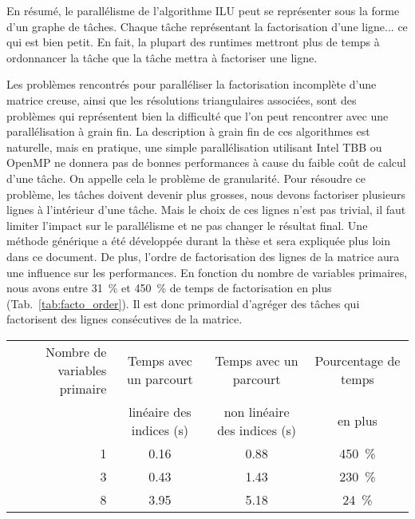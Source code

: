 En résumé, le parallélisme de l'algorithme ILU peut se représenter sous la forme d'un graphe de tâches.
%
Chaque tâche représentant la factorisation d'une ligne... ce qui est bien petit.
%
En fait, la plupart des runtimes mettront plus de temps à ordonnancer la tâche que la tâche mettra à factoriser une ligne.


Les problèmes rencontrés pour paralléliser la factorisation incomplète d'une matrice creuse, ainsi que les résolutions triangulaires associées, sont des problèmes qui représentent bien la difficulté que l'on peut rencontrer avec une parallélisation à grain fin.
%
La description à grain fin de ces algorithmes est naturelle, mais en pratique, une simple parallélisation utilisant Intel TBB ou OpenMP ne donnera pas de bonnes performances à cause du faible coût de calcul d'une tâche.
%
On appelle cela le problème de granularité.
%
Pour résoudre ce problème, les tâches doivent devenir plus grosses, nous devons factoriser plusieurs lignes à l'intérieur d'une tâche.
%
Mais le choix de ces lignes n'est pas trivial, il faut limiter l'impact sur le parallélisme et ne pas changer le résultat final.
%
Une méthode générique a été développée durant la thèse et sera expliquée plus loin dans ce document.
%
De plus, l'ordre de factorisation des lignes de la matrice aura une influence sur les performances.
%
En fonction du nombre de variables primaires, nous avons entre 31~\% et 450~\% de temps de factorisation en plus (Tab.~\ref{tab:facto_order}).
%
Il est donc primordial d'agréger des tâches qui factorisent des lignes consécutives de la matrice.

\begin{center}
  \begin{tabular}{|r|c|c|c|}
    \hline
    Nombre de variables primaire & Temps avec un parcourt & Temps avec un parcourt & Pourcentage de temps\\
    & linéaire des indices (s) & non linéaire des indices (s) & en plus \\
    \hline
    1 & 0.16 & 0.88 & 450~\% \\
    \hline
    3 & 0.43 & 1.43 & 230~\% \\
    \hline
    8 & 3.95 & 5.18 & 24~\% \\
    \hline
  \end{tabular}
  \label{tab:facto_order}
\end{center}




